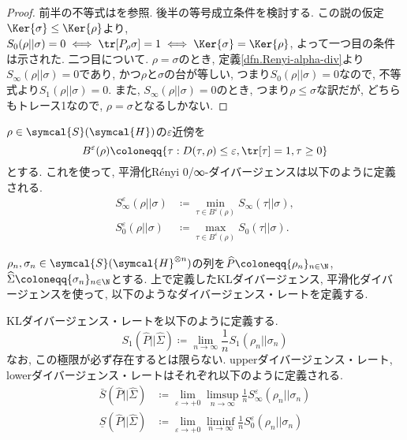 \begin{proof}
  前半の不等式は\cite{SagawaEntropy}を参照. 
  後半の等号成立条件を検討する. 
  この説の仮定$\Ker{\sigma}\leq\Ker{\rho}$より, $S_0(\rho||\sigma)=0\iff \tr[P_{\rho}\sigma]=1\iff \Ker{\sigma}=\Ker{\rho}$, よって一つ目の条件は示された. 
  二つ目について. 
  $\rho=\sigma$のとき, 定義\ref{dfn.Renyi-alpha-div}より$S_{\infty}(\rho||\sigma)=0$であり, かつ$\rho$と$\sigma$の台が等しい, つまり$S_0(\rho||\sigma)=0$なので, 不等式より$S_1(\rho||\sigma)=0$. 
  また, $S_{\infty}(\rho||\sigma)=0$のとき, つまり$\rho\leq\sigma$な訳だが, どちらもトレース1なので, $\rho=\sigma$となるしかない. 
\end{proof}

\begin{mydfn}\label{dfn.smoothed_Renyi-alpha-div}
  $\rho\in\symcal{S}(\symcal{H})$の$\varepsilon$近傍を
  \begin{equation}
    B^{\varepsilon}(\rho)\coloneqq \{\tau: D(\tau, \rho)\leq \varepsilon, \tr[\tau]=1, \tau\geq 0\}
  \end{equation}
  とする. 
  これを使って, 平滑化R\'{e}nyi 0/∞-ダイバージェンスは以下のように定義される. 
  \begin{align}
    S_{\infty}^{\varepsilon}(\rho||\sigma)&\coloneqq \min_{\tau\in B^{\varepsilon}(\rho)}S_{\infty}(\tau||\sigma), \label{dfn.smoothed_Renyi_infty_div}\\
    S_{0}^{\varepsilon}(\rho||\sigma)&\coloneqq \max_{\tau\in B^{\varepsilon}(\rho)}S_{0}(\tau||\sigma). \label{dfn.smoothed_Renyi_0_div}
  \end{align}
\end{mydfn}

${\rho}_n, \sigma_n\in\symcal{S}(\symcal{H}^{\otimes n})$の列を$\widehat{P}\coloneqq \{{\rho}_{n}\}_{n\in\N}$, $\widehat{\Sigma}\coloneqq \{\sigma_{n}\}_{n\in\N}$とする.
上で定義したKLダイバージェンス, 平滑化ダイバージェンスを使って, 以下のようなダイバージェンス・レートを定義する. 

\begin{mydfn}\label{dfn.Quantum_spectral_divergence_rates}
  KLダイバージェンス・レートを以下のように定義する. 
  \begin{equation}
    S_1(\widehat{P}||\widehat{\Sigma})\coloneqq \lim_{n\to\infty}\frac{1}{n}S_1(\rho_n||\sigma_n)
  \end{equation}
  なお, この極限が必ず存在するとは限らない. 
  upperダイバージェンス・レート, lowerダイバージェンス・レートはそれぞれ以下のように定義される. 
  \begin{align}
    \bar{S}(\widehat{P}||\widehat{\Sigma})&\coloneqq \lim_{\varepsilon\to +0}\limsup_{n\to\infty}\frac{1}{n}S_{\infty}^{\varepsilon}(\rho_n||\sigma_n)\\
    \underline{S}(\widehat{P}||\widehat{\Sigma})&\coloneqq \lim_{\varepsilon\to +0}\liminf_{n\to\infty}\frac{1}{n}S_{0}^{\varepsilon}(\rho_n||\sigma_n)
  \end{align}
\end{mydfn}


